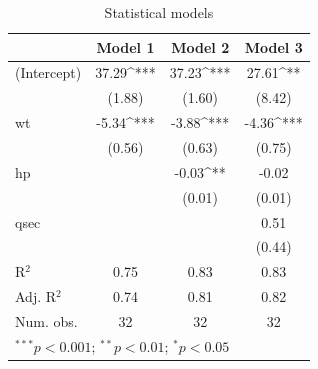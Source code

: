 
\begin{table}
\begin{center}
\begin{tabular}{l S[table-format=2.5] S[table-format=2.5] S[table-format=2.5]}
\toprule
 & {Model 1} & {Model 2} & {Model 3} \\
\midrule
(Intercept) & 37.29^{***} & 37.23^{***} & 27.61^{**}  \\
            & (1.88)      & (1.60)      & (8.42)      \\
wt          & -5.34^{***} & -3.88^{***} & -4.36^{***} \\
            & (0.56)      & (0.63)      & (0.75)      \\
hp          &             & -0.03^{**}  & -0.02       \\
            &             & (0.01)      & (0.01)      \\
qsec        &             &             & 0.51        \\
            &             &             & (0.44)      \\
\midrule
R$^2$       & 0.75        & 0.83        & 0.83        \\
Adj. R$^2$  & 0.74        & 0.81        & 0.82        \\
Num. obs.   & 32          & 32          & 32          \\
\bottomrule
{}
\end{tabular}
\caption{Statistical models}
\label{table:coefficients}
\end{center}
\end{table}
